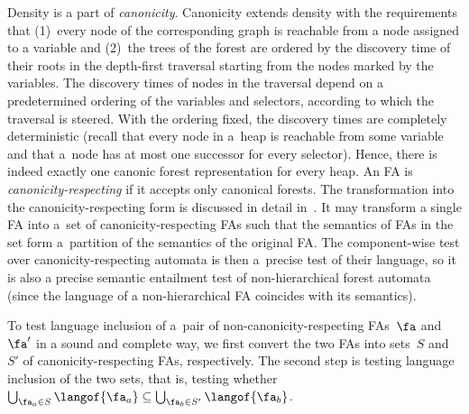 Density is a part of \emph{canonicity}.
%
Canonicity extends density with the requirements that
(1)~every node of the corresponding graph is reachable from a node assigned to a variable and
(2)~the trees of the forest are ordered by the discovery time of their roots in the depth-first traversal starting from the nodes marked by the variables. 
%
The discovery times of nodes in the traversal depend on a predetermined ordering
of the variables and selectors, according to which the traversal is steered.
With the ordering fixed, the discovery times are completely deterministic
(recall that every node in a~heap is reachable from some variable and that a~node
has at most one successor for every selector).
%
Hence, there is indeed exactly one canonic forest representation for every heap.
%
An FA is \emph{canonicity-respecting} if it accepts only canonical forests.
The transformation into the canonicity-respecting form is discussed in detail in~\cite{habermehl:forest,jiri:diza}. 
%
It may transform a single FA into a~set of canonicity-respecting FAs such that
the semantics of FAs in the set form a~partition of the semantics of the
original FA.
%
%
The component-wise test over canonicity-respecting automata is then a~precise
test of their language, so it is also a precise semantic entailment test of
non-hierarchical forest automata (since the language of a non-hierarchical FA
coincides with its semantics).


To test language inclusion of a~pair of non-canonicity-respecting FAs~$\fa$ and~$\fa'$ in a sound and complete way, 
we first convert the two FAs into sets~$S$ and~$S'$ of canonicity-respecting FAs, respectively.
The second step is testing language inclusion of the two sets, that is, testing whether $\bigcup_{\fa_a\in S}\langof{\fa_a} \subseteq \bigcup_{\fa_{b}\in S'}\langof{\fa_{b}}$.
%

